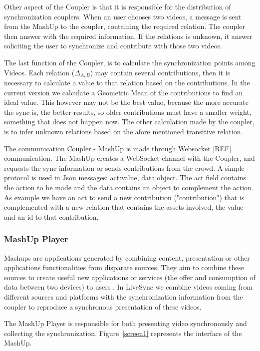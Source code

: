 \documentclass{sig-alternate-05-2015}
\begin{document}
Other aspect of the Coupler is that it is responsible for the distribution of synchronization couplers. When an user chooses two videos, a message is sent from the MashUp to the coupler, containing the required relation. The coupler then answer with the required information. If the relations is unknown, it answer soliciting the user to synchronize and contribute with those two videos.

The last function of the Coupler, is to calculate the synchronization points among Videos. Each relation ($\Delta_{A,B}$) may contain several contributions, then it is necessary to calculate a value to that relation based on the contributions. In the current version we calculate a Geometric Mean of the contributions to find an ideal value. This however may not be the best value, because the more accurate the sync is, the better results, so older contributions must have a smaller weight, something that does not happen now. The other calculation made by the coupler, is to infer unknown relations based on the afore mentioned transitive relation.

The communication Coupler - MashUp is made through Websocket [REF] communication. The MashUp creates a WebSocket channel with the Coupler, and requests the sync information or sends contributions from the crowd. A simple protocol is used in Json messages: {act:value, data:object}. The act field contains the action to be made and the data contains an object to complement the action. As example we have an act to send a new contribution ("contribution") that is complemented with a new relation that contains the assets involved, the value and an id to that contribution.

\subsubsection{MashUp Player}
Mashups are applications generated by combining content, presentation or other applications functionalities from disparate sources. They aim to combine these sources to create useful new applications or services (the offer and consumption of data between two devices) to users \cite{yu2008understanding}. In LiveSync we combine videos coming from different sources and platforms with the synchronization information from the coupler to reproduce a synchronous presentation of these videos.

The MashUp Player is responsible for both presenting video synchronously and collecting the synchronization. Figure~\ref{screen1} represents the interface of the MashUp.
\end{document}
